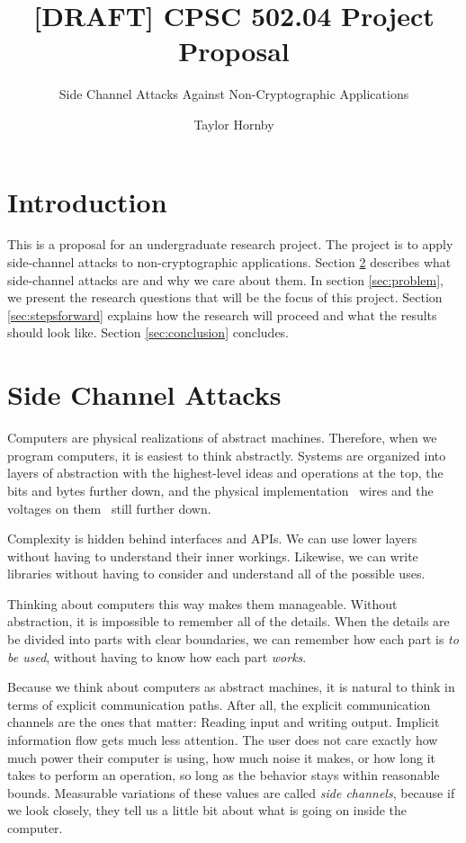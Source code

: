 \documentclass{acm_proc_article-sp}
\begin{document}
\title{[DRAFT] CPSC 502.04 Project Proposal}
\subtitle{Side Channel Attacks Against Non-Cryptographic Applications}


\author{
\alignauthor
Taylor Hornby
}

\maketitle

\section{Introduction}

This is a proposal for an undergraduate research project. The project is to
apply side-channel attacks to non-cryptographic applications. Section
\ref{sec:attacks} describes what side-channel attacks are and why we care about
them. In section \ref{sec:problem}, we present the research questions that will
be the focus of this project. Section \ref{sec:stepsforward} explains how the
research will proceed and what the results should look like. Section
\ref{sec:conclusion} concludes.

\section{Side Channel Attacks}
\label{sec:attacks}

Computers are physical realizations of abstract machines. Therefore, when we
program computers, it is easiest to think abstractly. Systems are organized into
layers of abstraction with the highest-level ideas and operations at the top,
the bits and bytes further down, and the physical implementation \textendash\
wires and the voltages on them \textendash\ still further down.

Complexity is hidden behind interfaces and APIs. We can use lower layers without
having to understand their inner workings. Likewise, we can write libraries
without having to consider and understand all of the possible uses.

Thinking about computers this way makes them manageable. Without abstraction, it
is impossible to remember all of the details. When the details are be divided
into parts with clear boundaries, we can remember how each part is \emph{to be
used}, without having to know how each part \emph{works}.

Because we think about computers as abstract machines, it is natural to think in
terms of explicit communication paths. After all, the explicit communication
channels are the ones that matter: Reading input and writing output. Implicit
information flow gets much less attention. The user does not care exactly how
much power their computer is using, how much noise it makes, or how long it
takes to perform an operation, so long as the behavior stays within reasonable
bounds. Measurable variations of these values are called \emph{side channels},
because if we look closely, they tell us a little bit about what is going on
inside the computer.
\end{document}
